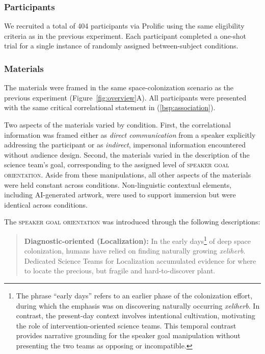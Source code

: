 \documentclass[10pt,letterpaper]{article}
\begin{document}
\subsubsection{Participants}

We recruited a total of 404 participants via Prolific using the same eligibility criteria as in the previous experiment. Each participant completed a one-shot trial for a single instance of randomly assigned between-subject conditions.

\subsubsection{Materials}

The materials %
were framed in the same space-colonization scenario as the previous experiment (Figure~\ref{fig:overview}A).
All participants were presented with the same critical correlational statement in (\ref{bsp:association}).

Two aspects of the materials varied by condition. First, the correlational information was framed either as \emph{direct communication} from a speaker explicitly addressing the participant or as \emph{indirect}, impersonal information encountered without audience design. Second, the materials varied in the description of the science team’s goal, corresponding to the assigned level of \textsc{speaker goal orientation}. Aside from these manipulations, all other aspects of the materials were held constant across conditions. Non-linguistic contextual elements, including AI-generated artwork, were used to support immersion but were identical across conditions.

The \textsc{speaker goal orientation} was introduced through the following descriptions:

\begin{quote}
    \small
    \textbf{Diagnostic-oriented (Localization):}  
    In the early days\footnote{The phrase “early days” refers to an earlier phase of the colonization effort, during which the emphasis was on discovering naturally occurring \textit{xeliherb}. In contrast, the present-day context involves intentional cultivation, motivating the role of intervention-oriented science teams. This temporal contrast provides narrative grounding for the speaker goal manipulation without presenting the two teams as opposing or incompatible.} of deep space colonization, humans have relied on finding naturally growing \textit{xeliherb}. Dedicated Science Teams for Localization accumulated evidence for where to locate the precious, but fragile and hard-to-discover plant.
\end{quote}
\end{document}
